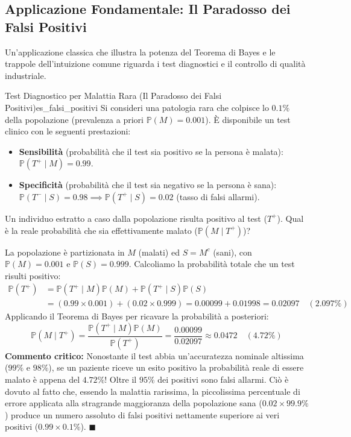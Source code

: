 \subsection{Applicazione Fondamentale: Il Paradosso dei Falsi Positivi}

Un'applicazione classica che illustra la potenza del Teorema di Bayes e le trappole dell'intuizione comune riguarda i test diagnostici e il controllo di qualità industriale.

\begin{esercizio}{Test Diagnostico per Malattia Rara (Il Paradosso dei Falsi Positivi)}{es_falsi_positivi}
Si consideri una patologia rara che colpisce lo $0.1\%$ della popolazione (prevalenza a priori $\mathbb{P}(M) = 0.001$). È disponibile un test clinico con le seguenti prestazioni:
\begin{itemize}
    \item \textbf{Sensibilità} (probabilità che il test sia positivo se la persona è malata): $\mathbb{P}(T^+ \mid M) = 0.99$.
    \item \textbf{Specificità} (probabilità che il test sia negativo se la persona è sana): $\mathbb{P}(T^- \mid S) = 0.98 \implies \mathbb{P}(T^+ \mid S) = 0.02$ (tasso di falsi allarmi).
\end{itemize}
Un individuo estratto a caso dalla popolazione risulta positivo al test ($T^+$). Qual è la reale probabilità che sia effettivamente malato ($\mathbb{P}(M \mid T^+)$)?
\end{esercizio}

\begin{dimostrazione}
La popolazione è partizionata in $M$ (malati) ed $S = M^c$ (sani), con $\mathbb{P}(M) = 0.001$ e $\mathbb{P}(S) = 0.999$.
Calcoliamo la probabilità totale che un test risulti positivo:
\begin{align*}
    \mathbb{P}(T^+) &= \mathbb{P}(T^+ \mid M)\mathbb{P}(M) + \mathbb{P}(T^+ \mid S)\mathbb{P}(S) \\
    &= (0.99 \times 0.001) + (0.02 \times 0.999) = 0.00099 + 0.01998 = \bm{0.02097} \quad (2.097\%)
\end{align*}
Applicando il Teorema di Bayes per ricavare la probabilità a posteriori:
\begin{equation*}
    \mathbb{P}(M \mid T^+) = \frac{\mathbb{P}(T^+ \mid M)\mathbb{P}(M)}{\mathbb{P}(T^+)} = \frac{0.00099}{0.02097} \approx \bm{0.0472} \quad (\bm{4.72\%})
\end{equation*}
\textbf{Commento critico:} Nonostante il test abbia un'accuratezza nominale altissima ($99\%$ e $98\%$), se un paziente riceve un esito positivo la probabilità reale di essere malato è appena del $\bm{4.72\%}$! Oltre il $95\%$ dei positivi sono falsi allarmi. Ciò è dovuto al fatto che, essendo la malattia rarissima, la piccolissima percentuale di errore applicata alla stragrande maggioranza della popolazione sana ($0.02 \times 99.9\%$) produce un numero assoluto di falsi positivi nettamente superiore ai veri positivi ($0.99 \times 0.1\%$). $\blacksquare$
\end{dimostrazione}

